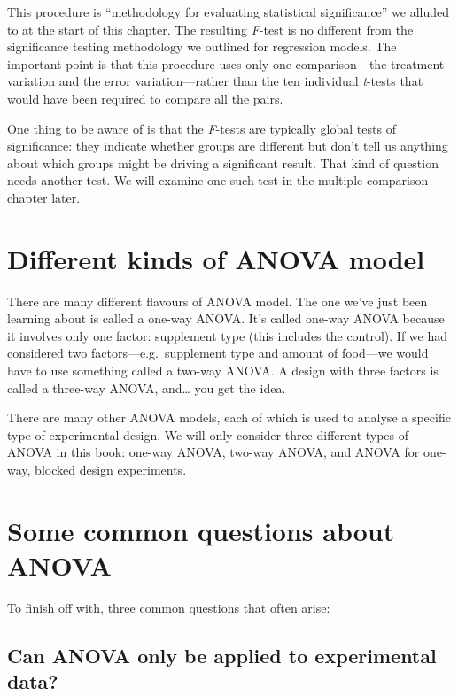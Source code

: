 \documentclass[
]{book}
\begin{document}
This procedure is ``methodology for evaluating statistical significance'' we alluded to at the start of this chapter. The resulting \emph{F}-test is no different from the significance testing methodology we outlined for regression models. The important point is that this procedure uses only one comparison---the treatment variation and the error variation---rather than the ten individual \emph{t}-tests that would have been required to compare all the pairs.

One thing to be aware of is that the \emph{F}-tests are typically global tests of significance: they indicate whether groups are different but don't tell us anything about which groups might be driving a significant result. That kind of question needs another test. We will examine one such test in the multiple comparison chapter later.

\hypertarget{different-kinds-of-anova-model}{%
\section{Different kinds of ANOVA model}\label{different-kinds-of-anova-model}}

There are many different flavours of ANOVA model. The one we've just been learning about is called a one-way ANOVA. It's called one-way ANOVA because it involves only one factor: supplement type (this includes the control). If we had considered two factors---e.g.~supplement type and amount of food---we would have to use something called a two-way ANOVA. A design with three factors is called a three-way ANOVA, and\ldots{} you get the idea.

There are many other ANOVA models, each of which is used to analyse a specific type of experimental design. We will only consider three different types of ANOVA in this book: one-way ANOVA, two-way ANOVA, and ANOVA for one-way, blocked design experiments.

\hypertarget{questions}{%
\section{Some common questions about ANOVA}\label{questions}}

To finish off with, three common questions that often arise:

\hypertarget{can-anova-only-be-applied-to-experimental-data}{%
\subsection{Can ANOVA only be applied to experimental data?}\label{can-anova-only-be-applied-to-experimental-data}}
\end{document}
